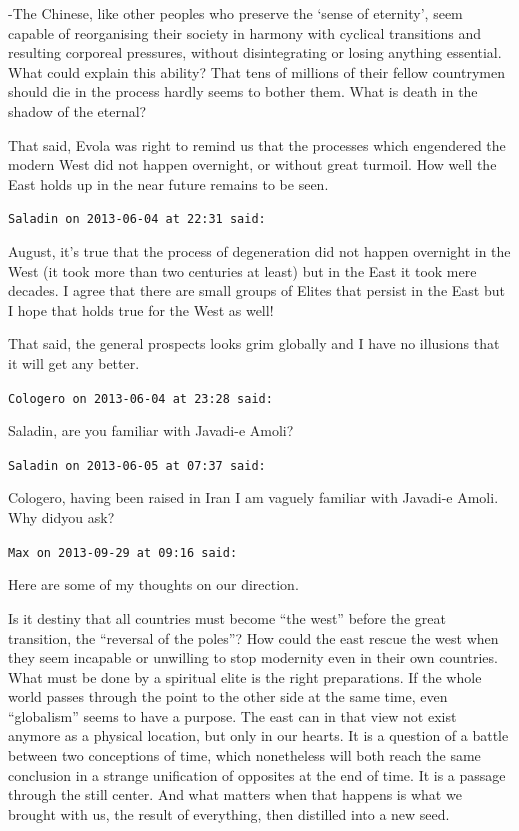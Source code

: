 \begin{footnotesize}
\begin{sffamily}
-The Chinese, like other peoples who preserve the `sense of eternity', seem capable of reorganising their society in harmony with cyclical transitions and resulting corporeal pressures, without disintegrating or losing anything essential. What could explain this ability? That tens of millions of their fellow countrymen should die in the process hardly seems to bother them. What is death in the shadow of the eternal?

That said, Evola was right to remind us that the processes which engendered the modern West did not happen overnight, or without great turmoil. How well the East holds up in the near future remains to be seen.

\hfill

\texttt{Saladin on 2013-06-04 at 22:31 said:}

August, it's true that the process of degeneration did not happen overnight in the West (it took more than two centuries at least) but in the East it took mere decades. I agree that there are small groups of Elites that persist in the East but I hope that holds true for the West as well!

That said, the general prospects looks grim globally and I have no illusions that it will get any better.

\hfill

\texttt{Cologero on 2013-06-04 at 23:28 said:}

Saladin, are you familiar with Javadi-e Amoli?

\hfill

\texttt{Saladin on 2013-06-05 at 07:37 said:}

Cologero, having been raised in Iran I am vaguely familiar with Javadi-e Amoli. Why didyou ask?

\hfill

\texttt{Max on 2013-09-29 at 09:16 said:}

Here are some of my thoughts on our direction.

Is it destiny that all countries must become ``the west'' before the great transition, the ``reversal of the poles''? How could the east rescue the west when they seem incapable or unwilling to stop modernity even in their own countries. What must be done by a spiritual elite is the right preparations. If the whole world passes through the point to the other side at the same time, even ``globalism'' seems to have a purpose. The east can in that view not exist anymore as a physical location, but only in our hearts. It is a question of a battle between two conceptions of time, which nonetheless will both reach the same conclusion in a strange unification of opposites at the end of time. It is a passage through the still center. And what matters when that happens is what we brought with us, the result of everything, then distilled into a new seed.


\end{sffamily}
\end{footnotesize}
